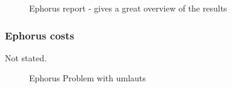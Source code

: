  \begin{figure}[!h]
  \centering
  \caption{Ephorus report - gives a great overview of the results}
  \label{fig:Ephorus_report}
\end{figure}




\subsubsection*{Ephorus costs}
Not stated.

 \begin{figure}[!h]
  \centering
  \caption{Ephorus Problem with umlauts}
  \label{fig:Euphorus_umlauts}
\end{figure}













